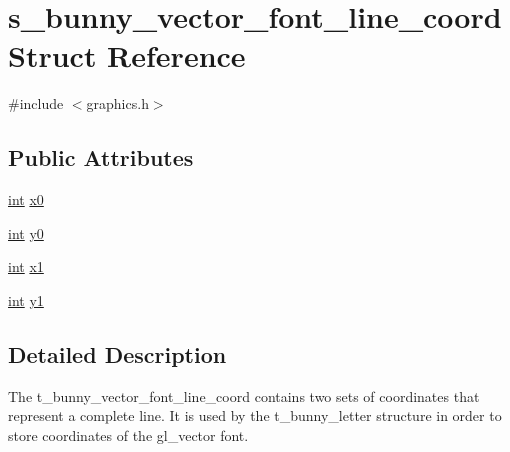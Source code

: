 \hypertarget{structs__bunny__vector__font__line__coord}{\section{s\-\_\-bunny\-\_\-vector\-\_\-font\-\_\-line\-\_\-coord Struct Reference}
\label{structs__bunny__vector__font__line__coord}
}


{\ttfamily \#include $<$graphics.\-h$>$}

\subsection*{Public Attributes}
\begin{DoxyCompactItemize}
\item 
\hyperlink{term__entry_8h_ad65b480f8c8270356b45a9890f6499ae}{int} \hyperlink{structs__bunny__vector__font__line__coord_aecb89f13405cb07d27de8fe0a067a620}{x0}
\item 
\hyperlink{term__entry_8h_ad65b480f8c8270356b45a9890f6499ae}{int} \hyperlink{structs__bunny__vector__font__line__coord_ac3756f7b4c4e0079bea0c065c0346c00}{y0}
\item 
\hyperlink{term__entry_8h_ad65b480f8c8270356b45a9890f6499ae}{int} \hyperlink{structs__bunny__vector__font__line__coord_a3935686b372a0a2f3170140ff317d9ce}{x1}
\item 
\hyperlink{term__entry_8h_ad65b480f8c8270356b45a9890f6499ae}{int} \hyperlink{structs__bunny__vector__font__line__coord_afd41146225993809226b256cf9b733f1}{y1}
\end{DoxyCompactItemize}


\subsection{Detailed Description}
The t\-\_\-bunny\-\_\-vector\-\_\-font\-\_\-line\-\_\-coord contains two sets of coordinates that represent a complete line. It is used by the t\-\_\-bunny\-\_\-letter structure in order to store coordinates of the gl\-\_\-vector font. 

